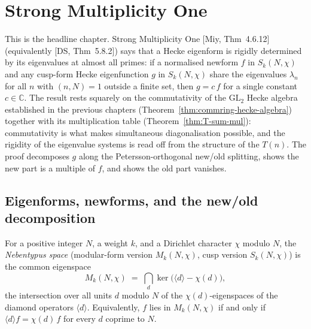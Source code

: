 \chapter{Strong Multiplicity One}\label{chap:smo}

This is the headline chapter. Strong Multiplicity One [Miy, Thm~4.6.12] (equivalently [DS, Thm~5.8.2])
says that a Hecke eigenform is rigidly determined by its eigenvalues at almost all primes: if a
normalised newform $f$ in $S_k(N,\chi)$ and any cusp-form Hecke eigenfunction $g$ in $S_k(N,\chi)$
share the eigenvalues $\lambda_n$ for all $n$ with $(n,N)=1$ outside a finite set, then $g=c\,f$ for a
single constant $c\in\mathbb{C}$. The result rests squarely on the commutativity of the $\mathrm{GL}_2$
Hecke algebra established in the previous chapters (Theorem~\ref{thm:commring-hecke-algebra}) together
with its multiplication table (Theorem~\ref{thm:T-sum-mul}): commutativity is what makes simultaneous
diagonalisation possible, and the rigidity of the eigenvalue systems is read off from the structure of
the $T(n)$. The proof decomposes $g$ along the Petersson-orthogonal new/old splitting, shows the new
part is a multiple of $f$, and shows the old part vanishes.

\section{Eigenforms, newforms, and the new/old decomposition}

\begin{definition}\label{def:modFormCharSpace}
\leanok
For a positive integer $N$, a weight $k$, and a Dirichlet character $\chi$ modulo $N$, the
\emph{Nebentypus space} (modular-form version $M_k(N,\chi)$, cusp version $S_k(N,\chi)$) is the
common eigenspace
\[
  M_k(N,\chi) \;=\; \bigcap_{d} \ker\bigl(\langle d\rangle - \chi(d)\bigr),
\]
the intersection over all units $d$ modulo $N$ of the $\chi(d)$-eigenspaces of the diamond operators
$\langle d\rangle$. Equivalently, $f$ lies in $M_k(N,\chi)$ if and only if $\langle d\rangle f=\chi(d)\,f$
for every $d$ coprime to $N$.
\end{definition}

